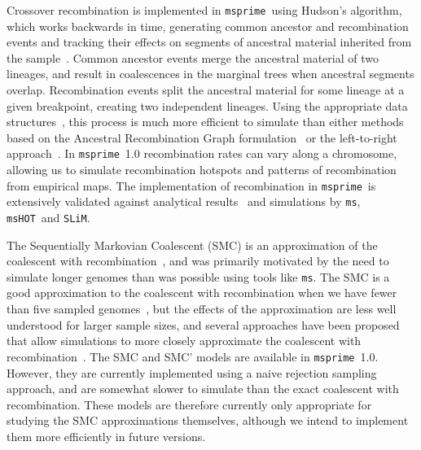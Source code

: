 \documentclass{article}
\newcommand{\msprime}[0]{\texttt{msprime}}
\newcommand{\ms}[0]{\texttt{ms}}
\newcommand{\msHOT}[0]{\texttt{msHOT}}
\newcommand{\SLiM}[0]{\texttt{SLiM}}
\begin{document}
Crossover recombination is implemented in \msprime\ using Hudson's algorithm, which
works backwards in time, generating common ancestor and recombination
events and tracking their effects on segments of ancestral
material inherited from the
sample~\citep{hudson1983properties,hudson1990gene,kelleher2016efficient}.
Common ancestor events merge the ancestral material of two lineages,
and result in coalescences in the marginal trees when ancestral
segments overlap.
Recombination events split the ancestral material for some lineage
at a given breakpoint, creating two independent
lineages. Using the appropriate data structures~\citep{kelleher2016efficient},
this process is much more efficient to simulate than either
methods based on the Ancestral Recombination Graph
formulation~\citep{griffiths1991two,griffiths1997ancestral}
or the left-to-right approach~\citep{wiuf1999recombination,wiuf1999ancestry}.
In \msprime\ 1.0 recombination rates can vary along a chromosome, allowing
us to simulate recombination hotspots and patterns
of recombination from empirical maps.
The implementation of recombination in \msprime\ is extensively validated
against analytical results~\citep{hudson1983properties,kaplan1985use}
and simulations by \ms, \msHOT\ and \SLiM.

The Sequentially Markovian Coalescent (SMC) is an approximation of the
coalescent with recombination~\citep{mcvean2005approximating,marjoram2006fast},
and was primarily motivated by the need to
simulate longer genomes than was possible using tools like \ms.
The SMC is a good approximation to the
coalescent with recombination when we have fewer than five sampled
genomes~\citep{hobolth2014markovian,wilton2015smc}, but the
effects of the approximation are less well understood for larger
sample sizes, and several approaches have been proposed
that allow simulations to more closely approximate the coalescent
with recombination~\citep{chen2009fast,wang2014new,staab2015scrm}.
The SMC and SMC' models are available
in \msprime\ 1.0. However, they are currently implemented using a
naive rejection sampling approach, and are somewhat slower
to simulate than the exact coalescent with recombination. These
models are therefore currently only appropriate for studying the
SMC approximations themselves, although we intend to
implement them more efficiently in future versions.
\end{document}
